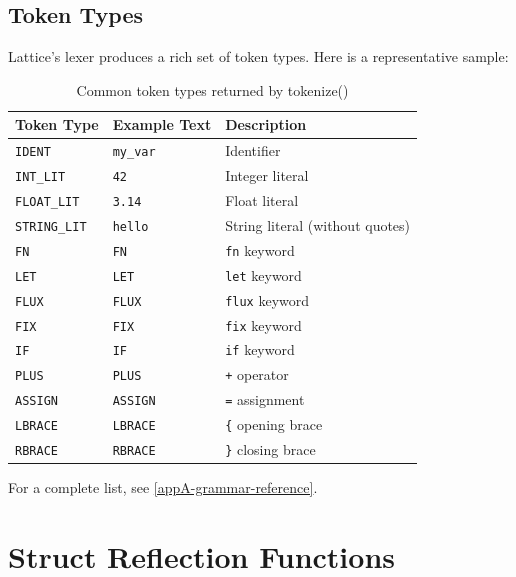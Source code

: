 \subsection{Token Types}

Lattice's lexer produces a rich set of token types.
Here is a representative sample:

\begin{table}[h]
\centering
\caption{Common token types returned by tokenize()}\label{tab:token-types}
\begin{tabular}{@{} l l p{5.5cm} @{}}
\toprule
\textbf{Token Type} & \textbf{Example Text} & \textbf{Description} \\
\midrule
\texttt{IDENT}       & \texttt{my\_var}    & Identifier \\
\texttt{INT\_LIT}    & \texttt{42}         & Integer literal \\
\texttt{FLOAT\_LIT}  & \texttt{3.14}       & Float literal \\
\texttt{STRING\_LIT} & \texttt{hello}      & String literal (without quotes) \\
\texttt{FN}          & \texttt{FN}         & \lstinline|fn| keyword \\
\texttt{LET}         & \texttt{LET}        & \lstinline|let| keyword \\
\texttt{FLUX}        & \texttt{FLUX}       & \lstinline|flux| keyword \\
\texttt{FIX}         & \texttt{FIX}        & \lstinline|fix| keyword \\
\texttt{IF}          & \texttt{IF}         & \lstinline|if| keyword \\
\texttt{PLUS}        & \texttt{PLUS}       & \texttt{+} operator \\
\texttt{ASSIGN}      & \texttt{ASSIGN}     & \texttt{=} assignment \\
\texttt{LBRACE}      & \texttt{LBRACE}     & \texttt{\{} opening brace \\
\texttt{RBRACE}      & \texttt{RBRACE}     & \texttt{\}} closing brace \\
\bottomrule
\end{tabular}
\end{table}

For a complete list, see \cref{appA-grammar-reference}.

\section{Struct Reflection Functions}\label{sec:struct-reflection}

